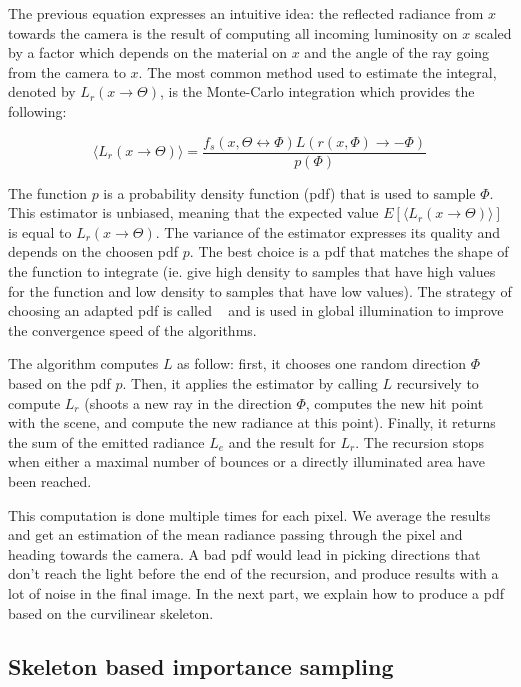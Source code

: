 The previous equation expresses an intuitive idea: the reflected radiance from $x$ towards the camera is the result of computing all incoming luminosity on $x$ scaled by a factor which depends on the material on $x$ and the angle of the ray going from the camera to $x$. The most common method used to estimate the integral, denoted by $L_r(x \rightarrow \Theta)$, is the Monte-Carlo integration which provides the following:

\begin{equation*}
\langle L_r(x \rightarrow \Theta) \rangle = \frac{f_s(x, \Theta \leftrightarrow \Phi) L(r(x, \Phi) \rightarrow -\Phi)}{p(\Phi)}
\end{equation*}

The function $p$ is a probability density function (pdf) that is used to sample $\Phi$. This estimator is unbiased, meaning that the expected value $E[\langle L_r(x \rightarrow \Theta) \rangle]$ is equal to $L_r(x \rightarrow \Theta)$. The variance of the estimator expresses its quality and depends on the choosen pdf $p$. The best choice is a pdf that matches the shape of the function to integrate (ie. give high density to samples that have high values for the function and low density to samples that have low values).
The strategy of choosing an adapted pdf is called ~\cite{Ka86} and is used in global illumination to improve the convergence speed of the algorithms.

The algorithm computes $L$ as follow: first, it chooses one random direction $\Phi$ based on the pdf $p$. Then, it applies the estimator by calling $L$ recursively to compute $L_r$ (shoots a new ray in the direction $\Phi$, computes the new hit point with the scene, and compute the new radiance at this point). Finally, it returns the sum of the emitted radiance $L_e$ and the result for $L_r$. The recursion stops when either a maximal number of bounces or a directly illuminated area have been reached.

This computation is done multiple times for each pixel. We average the results and get an estimation of the mean radiance passing through the pixel and heading towards the camera.
A bad pdf would lead in picking directions that don't reach the light before the end of the recursion, and produce results with a lot of noise in the final image. In the next part, we explain how to produce a pdf based on the curvilinear skeleton.


\subsection{Skeleton based importance sampling}

